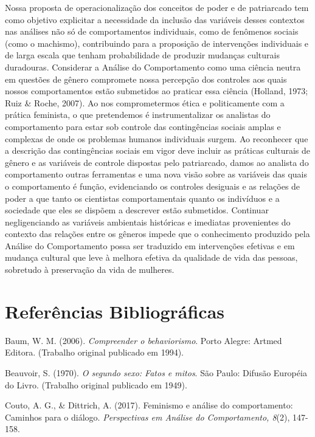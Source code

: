 Nossa proposta de operacionalização dos conceitos de poder e de patriarcado tem como objetivo explicitar a necessidade da inclusão das variáveis desses contextos nas análises não só de comportamentos individuais, como de fenômenos sociais (como o machismo), contribuindo para a proposição de intervenções individuais e de larga escala que tenham probabilidade de produzir mudanças culturais duradouras. Considerar a Análise do Comportamento como uma ciência neutra em questões de gênero compromete nossa percepção dos controles aos quais nossos comportamentos estão submetidos ao praticar essa ciência (Holland, 1973; Ruiz \& Roche, 2007). Ao nos comprometermos ética e politicamente com a prática feminista, o que pretendemos é instrumentalizar os analistas do comportamento para estar sob controle das contingências sociais amplas e complexas de onde os problemas humanos individuais surgem. Ao reconhecer que a descrição das contingências sociais em vigor deve incluir as práticas culturais de gênero e as variáveis de controle dispostas pelo patriarcado, damos ao analista do comportamento outras ferramentas e uma nova visão sobre as variáveis das quais o comportamento é função, evidenciando os controles desiguais e as relações de poder a que tanto os cientistas comportamentais quanto os indivíduos e a sociedade que eles se dispõem a descrever estão submetidos. Continuar negligenciando as variáveis ambientais históricas e imediatas provenientes do contexto das relações entre os gêneros impede que o conhecimento produzido pela Análise do Comportamento possa ser traduzido em intervenções efetivas e em mudança cultural que leve à melhora efetiva da qualidade de vida das pessoas, sobretudo à preservação da vida de mulheres.
\vfill
\pagebreak
\section*{Referências Bibliográficas}

\hangindent=25pt
\noindent Baum, W. M. (2006). \textit{Compreender o behaviorismo}. Porto Alegre: Artmed Editora. (Trabalho original publicado em 1994).

\hangindent=25pt
\noindent Beauvoir, S. (1970). \textit{O segundo sexo: Fatos e mitos}. São Paulo: Difusão Européia do Livro. (Trabalho original publicado em 1949).

\hangindent=25pt
\noindent Couto, A. G., \& Dittrich, A. (2017). Feminismo e análise do comportamento: Caminhos para o diálogo. \textit{Perspectivas em Análise do Comportamento, 8}(2), 147-158.

